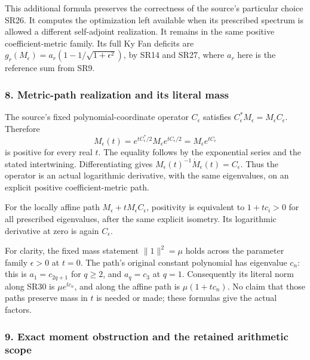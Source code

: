 This additional formula preserves the correctness of the source's particular choice SR26. It computes the optimization left available when its prescribed spectrum is allowed a different self-adjoint realization. It remains in the same positive coefficient-metric family. Its full Ky Fan deficits are \(g_r(M_\epsilon)=a_r(1-1/\sqrt{1+\epsilon^2})\), by SR14 and SR27, where \(a_r\) here is the reference sum from SR9.

\subsubsection{8. Metric-path realization and its literal mass}\label{endpoint-four_window_sharpness_review--metric-path-realization-and-its-literal-mass}

The source's fixed polynomial-coordinate operator \(C_\epsilon\) satisfies \(C_\epsilon^*M_\epsilon=M_\epsilon C_\epsilon\). Therefore \[
M_\epsilon(t)
=e^{tC_\epsilon^*/2}M_\epsilon e^{tC_\epsilon/2}
=M_\epsilon e^{tC_\epsilon}
\tag{SR30}
\] is positive for every real \(t\). The equality follows by the exponential series and the stated intertwining. Differentiating gives \(M_\epsilon(t)^{-1}\dot M_\epsilon(t)=C_\epsilon\). Thus the operator is an actual logarithmic derivative, with the same eigenvalues, on an explicit positive coefficient-metric path.

For the locally affine path \(M_\epsilon+tM_\epsilon C_\epsilon\), positivity is equivalent to \(1+tc_i>0\) for all prescribed eigenvalues, after the same explicit isometry. Its logarithmic derivative at zero is again \(C_\epsilon\).

For clarity, the fixed mass statement \(\|1\|^2=\mu\) holds across the parameter family \(\epsilon>0\) at \(t=0\). The path's original constant polynomial has eigenvalue \(c_n\): this is \(a_1=c_{2q+1}\) for \(q\ge2\), and \(a_q=c_3\) at \(q=1\). Consequently its literal norm along SR30 is \(\mu e^{tc_n}\), and along the affine path is \(\mu(1+tc_n)\). No claim that those paths preserve mass in \(t\) is needed or made; these formulas give the actual factors.

\subsubsection{9. Exact moment obstruction and the retained arithmetic scope}\label{endpoint-four_window_sharpness_review--exact-moment-obstruction-and-the-retained-arithmetic-scope}

